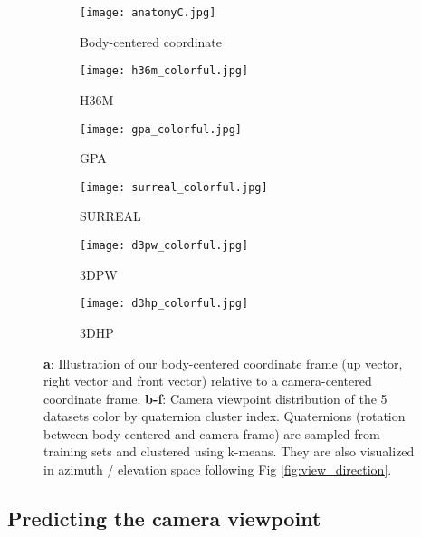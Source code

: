 \documentclass[runningheads]{llncs}
\begin{document}
\begin{figure*}[t]
\centering
\begin{subfigure}{0.36\textwidth}
\texttt{[image: anatomyC.jpg]}
\caption{Body-centered coordinate} \label{fig:2a}
\end{subfigure}
\hspace*{\fill}
\begin{subfigure}{0.30\textwidth}
\texttt{[image: h36m\_colorful.jpg]}
\caption{\textsc{H36M}} \label{fig:2b}
\end{subfigure}
\hspace*{\fill}
\begin{subfigure}{0.30\textwidth}
\texttt{[image: gpa\_colorful.jpg]}
\caption{\textsc{GPA}} \label{fig:2c}
\end{subfigure}
\hspace*{\fill}
\begin{subfigure}{0.32\textwidth}
\texttt{[image: surreal\_colorful.jpg]}
\caption{\textsc{SURREAL}} \label{fig:2d}
\end{subfigure}
\hspace*{\fill}
\begin{subfigure}{0.32\textwidth}
\texttt{[image: d3pw\_colorful.jpg]}
\caption{\textsc{3DPW}} \label{fig:2e}
\end{subfigure}
\hspace*{\fill}
\begin{subfigure}{0.32\textwidth}
\texttt{[image: d3hp\_colorful.jpg]}
\caption{\textsc{3DHP}} \label{fig:2f}
\end{subfigure}
\caption{\textbf{a}: Illustration of our body-centered coordinate frame (up
vector, right vector and front vector) relative to a camera-centered coordinate
frame. \textbf{b-f}: Camera viewpoint distribution 
of the 5 datasets color by quaternion cluster index. Quaternions (rotation 
between body-centered and camera frame) are
sampled from training sets and clustered using k-means. They are
also visualized in azimuth / elevation space following Fig
\ref{fig:view_direction}.}
\label{fig:body-centeredUFR}
\vspace{-0.15in}
\end{figure*}


\subsection{Predicting the camera viewpoint}
\end{document}
